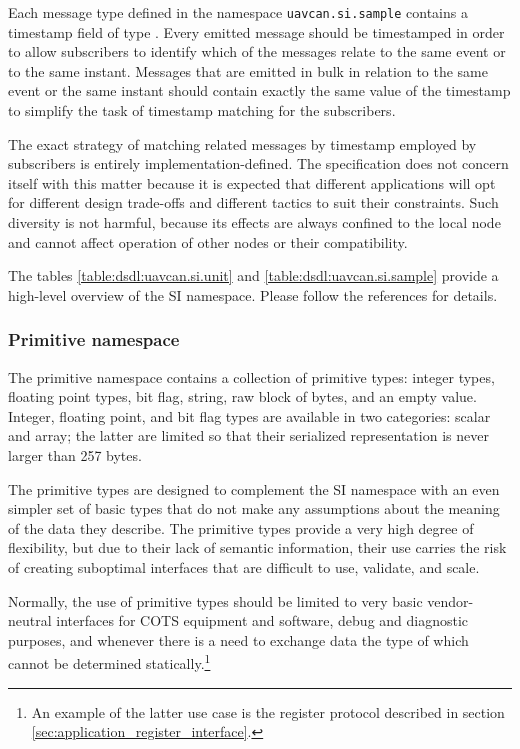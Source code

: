 Each message type defined in the namespace \verb|uavcan.si.sample| contains a timestamp field of type
.
Every emitted message should be timestamped in order to allow subscribers to identify which of the messages
relate to the same event or to the same instant.
Messages that are emitted in bulk in relation to the same event or the same instant should contain
exactly the same value of the timestamp to simplify the task of timestamp matching for the subscribers.

The exact strategy of matching related messages by timestamp employed by subscribers is entirely
implementation-defined.
The specification does not concern itself with this matter because it is expected that different applications
will opt for different design trade-offs and different tactics to suit their constraints.
Such diversity is not harmful, because its effects are always confined to the local node and cannot affect
operation of other nodes or their compatibility.

The tables \ref{table:dsdl:uavcan.si.unit} and \ref{table:dsdl:uavcan.si.sample}
provide a high-level overview of the SI namespace.
Please follow the references for details.



\subsubsection{Primitive namespace}

The primitive namespace contains a collection of primitive types:
integer types, floating point types, bit flag, string, raw block of bytes, and an empty value.
Integer, floating point, and bit flag types are available in two categories: scalar and array;
the latter are limited so that their serialized representation is never larger than 257 bytes.

The primitive types are designed to complement the SI namespace with an even simpler set of basic types
that do not make any assumptions about the meaning of the data they describe.
The primitive types provide a very high degree of flexibility, but due to their lack of semantic information,
their use carries the risk of creating suboptimal interfaces that are difficult to use, validate, and scale.

Normally, the use of primitive types should be limited to very basic vendor-neutral interfaces for COTS
equipment and software, debug and diagnostic purposes, and whenever there is a need to exchange data the
type of which cannot be determined statically.\footnote{An example of the latter use case is the register protocol
described in section \ref{sec:application_register_interface}.}

